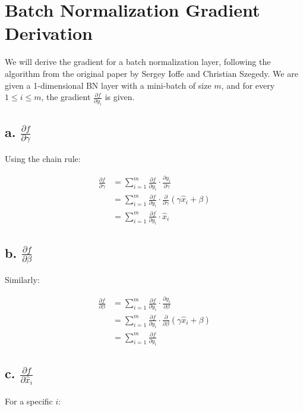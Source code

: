 \section*{Batch Normalization Gradient Derivation}

We will derive the gradient for a batch normalization layer, following the algorithm from the original paper by Sergey Ioffe and Christian Szegedy. We are given a 1-dimensional BN layer with a mini-batch of size $m$, and for every $1 \leq i \leq m$, the gradient $\frac{\partial f}{\partial y_i}$ is given.

\subsection*{a. $\frac{\partial f}{\partial \gamma}$}

Using the chain rule:

\begin{align*}
\frac{\partial f}{\partial \gamma} &= \sum_{i=1}^m \frac{\partial f}{\partial y_i} \cdot \frac{\partial y_i}{\partial \gamma} \\
&= \sum_{i=1}^m \frac{\partial f}{\partial y_i} \cdot \frac{\partial}{\partial \gamma}(\gamma \hat{x}_i + \beta) \\
&= \sum_{i=1}^m \frac{\partial f}{\partial y_i} \cdot \hat{x}_i
\end{align*}

\subsection*{b. $\frac{\partial f}{\partial \beta}$}

Similarly:

\begin{align*}
\frac{\partial f}{\partial \beta} &= \sum_{i=1}^m \frac{\partial f}{\partial y_i} \cdot \frac{\partial y_i}{\partial \beta} \\
&= \sum_{i=1}^m \frac{\partial f}{\partial y_i} \cdot \frac{\partial}{\partial \beta}(\gamma \hat{x}_i + \beta) \\
&= \sum_{i=1}^m \frac{\partial f}{\partial y_i}
\end{align*}

\subsection*{c. $\frac{\partial f}{\partial \hat{x}_i}$}

For a specific $i$:

